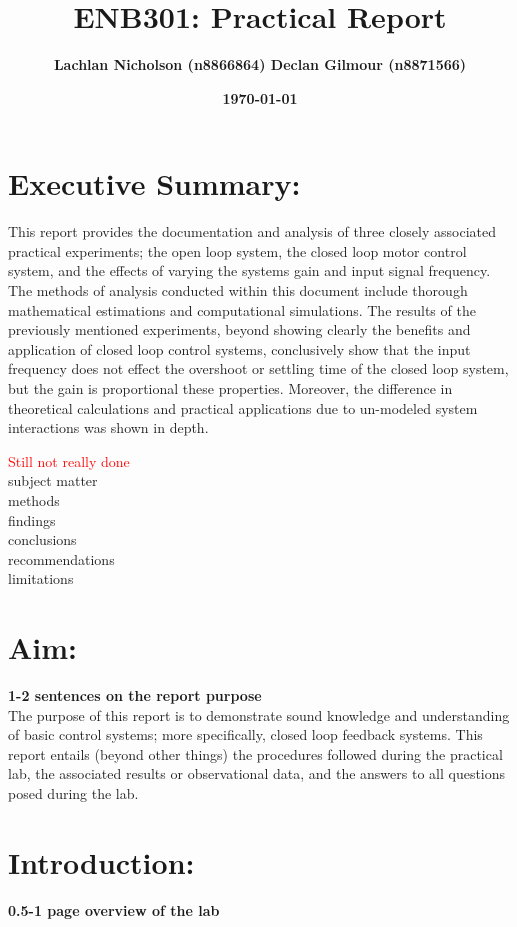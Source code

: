 \documentclass[11pt,a4paper]{article}
\title{\textbf{ENB301: Practical Report}}
\author{\textbf{Lachlan Nicholson (n8866864) Declan Gilmour (n8871566)}}
\date{\textbf{\today}}
\begin{document}
\maketitle

\section{Executive Summary:}
This report provides the documentation and analysis of three closely associated practical experiments; the open loop system, the closed loop motor control system, and the effects of varying the systems gain and input signal frequency. 
The methods of analysis conducted within this document include thorough mathematical estimations and computational simulations.
The results of the previously mentioned experiments, beyond showing clearly the benefits and application of closed loop control systems, conclusively show that the input frequency does not effect the overshoot or settling time of the closed loop system, but the gain is proportional these properties. Moreover, the difference in theoretical calculations and practical applications due to un-modeled system interactions was shown in depth.  

\textcolor{red}{Still not really done}\\
subject matter\\
methods\\
findings\\
conclusions\\
recommendations\\
limitations\\

\section{Aim:}
\textbf{1-2 sentences on the report purpose}\\
The purpose of this report is to demonstrate sound knowledge and understanding of basic control systems; more specifically, closed loop feedback systems. This report entails (beyond other things) the procedures followed during the practical lab, the associated results or observational data, and the answers to all questions posed during the lab.  

\section{Introduction:}
\textbf{0.5-1 page overview of the lab}
\end{document}
